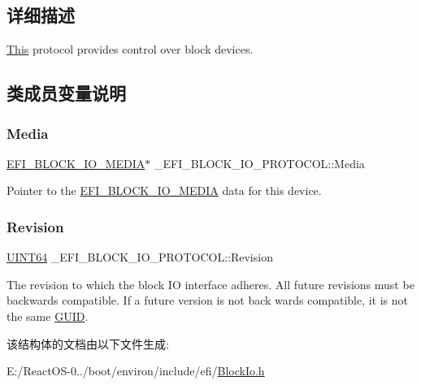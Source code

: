 \subsection{详细描述}
\hyperlink{namespace_this}{This} protocol provides control over block devices. 

\subsection{类成员变量说明}
\mbox{\label{struct___e_f_i___b_l_o_c_k___i_o___p_r_o_t_o_c_o_l_a3a970fbdbdf06f9e9dce16a80dd2ec96}} 
\subsubsection{\texorpdfstring{Media}{Media}}
{\footnotesize\ttfamily \hyperlink{struct_e_f_i___b_l_o_c_k___i_o___m_e_d_i_a}{E\+F\+I\+\_\+\+B\+L\+O\+C\+K\+\_\+\+I\+O\+\_\+\+M\+E\+D\+IA}$\ast$ \+\_\+\+E\+F\+I\+\_\+\+B\+L\+O\+C\+K\+\_\+\+I\+O\+\_\+\+P\+R\+O\+T\+O\+C\+O\+L\+::\+Media}

Pointer to the \hyperlink{struct_e_f_i___b_l_o_c_k___i_o___m_e_d_i_a}{E\+F\+I\+\_\+\+B\+L\+O\+C\+K\+\_\+\+I\+O\+\_\+\+M\+E\+D\+IA} data for this device. \mbox{\label{struct___e_f_i___b_l_o_c_k___i_o___p_r_o_t_o_c_o_l_a8ebcb5fbf96bc58b1c54e154e292c372}} 
\subsubsection{\texorpdfstring{Revision}{Revision}}
{\footnotesize\ttfamily \hyperlink{_processor_bind_8h_a57be03562867144161c1bfee95ca8f7c}{U\+I\+N\+T64} \+\_\+\+E\+F\+I\+\_\+\+B\+L\+O\+C\+K\+\_\+\+I\+O\+\_\+\+P\+R\+O\+T\+O\+C\+O\+L\+::\+Revision}

The revision to which the block IO interface adheres. All future revisions must be backwards compatible. If a future version is not back wards compatible, it is not the same \hyperlink{interface_g_u_i_d}{G\+U\+ID}. 

该结构体的文档由以下文件生成\+:\begin{DoxyCompactItemize}
\item 
E\+:/\+React\+O\+S-\/0../boot/environ/include/efi/\hyperlink{_block_io_8h}{Block\+Io.\+h}\end{DoxyCompactItemize}
